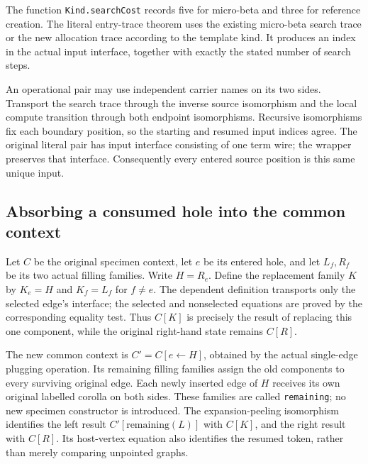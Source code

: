 The function \texttt{Kind.searchCost} records five for micro-beta and three
for reference creation. The literal entry-trace theorem uses the existing
micro-beta search trace or the new allocation trace according to the
template kind. It produces an index in the actual input interface, together
with exactly the stated number of search steps.


An operational pair may use independent carrier names on its two sides.
Transport the search trace through the inverse source isomorphism and the
local compute transition through both endpoint isomorphisms. Recursive
isomorphisms fix each boundary position, so the starting and resumed input
indices agree. The original literal pair has input interface consisting of
one term wire; the wrapper preserves that interface. Consequently every
entered source position is this same unique input.


\subsection{Absorbing a consumed hole into the common context}
Let $C$ be the original specimen context, let $e$ be its entered hole,
and let $L_f,R_f$ be its two actual filling families. Write $H=R_e$.
Define the replacement family $K$ by $K_e=H$ and $K_f=L_f$ for $f\ne e$.
The dependent definition transports only the selected edge's interface;
the selected and nonselected equations are proved by the corresponding
equality test. Thus $C[K]$ is precisely the result of replacing this one
component, while the original right-hand state remains $C[R]$.


The new common context is $C'=C[e\leftarrow H]$, obtained by the actual
single-edge plugging operation. Its remaining filling families assign the
old components to every surviving original edge. Each newly inserted edge
of $H$ receives its own original labelled corolla on both sides. These
families are called \texttt{remaining}; no new specimen constructor is
introduced. The expansion-peeling isomorphism identifies the left result
$C'[\mathrm{remaining}(L)]$ with $C[K]$, and the right result with $C[R]$.
Its host-vertex equation also identifies the resumed token, rather than
merely comparing unpointed graphs.

